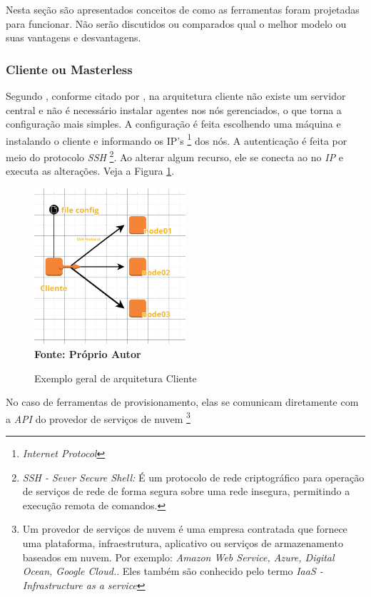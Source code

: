 Nesta seção são apresentados conceitos de como as ferramentas foram projetadas para funcionar. Não serão discutidos ou comparados qual o melhor modelo ou suas vantagens e desvantagens. 

\subsubsection{Cliente ou Masterless} \label{semagent}
Segundo , conforme citado por , na arquitetura cliente não existe um servidor central e não é necessário instalar agentes nos nós gerenciados, o que torna a configuração mais simples. A configuração é feita escolhendo uma máquina e instalando o cliente e informando os IP's \footnote{\textit{Internet Protocol}} dos nós. A autenticação é feita por meio do protocolo \textit{SSH} \footnote{\textit{SSH - Sever Secure Shell:}  É um protocolo de rede criptográfico para operação de serviços de rede de forma segura sobre uma rede insegura, permitindo a execução remota de comandos.}. Ao alterar algum recurso, ele se conecta ao no \textit{IP} e executa as alterações.  Veja a Figura  \ref{fig:figura3}. 

\begin{figure}[H]
	\centering	
	\caption[\hspace{0.1cm}Exemplo arquitetura Cliente]{Exemplo geral de arquitetura Cliente}
	\vspace{-0.4cm}
	\includegraphics[width=0.5\textwidth]{figuras/cliente.png}
	 \vspace{-0.2cm}
	\\\textbf{\footnotesize Fonte: Próprio Autor}
	\label{fig:figura3}
\end{figure}
\vspace{-0.5cm}


No caso de ferramentas de provisionamento, elas se comunicam diretamente com a \textit{API} do provedor de serviços de nuvem \footnote{Um provedor de serviços de nuvem é uma empresa contratada que fornece uma plataforma, infraestrutura, aplicativo ou serviços de armazenamento baseados em nuvem. Por exemplo: \textit{Amazon Web Service, Azure, Digital Ocean, Google Cloud.}. Eles também são conhecido pelo termo \textit{IaaS - Infrastructure as a service} }


